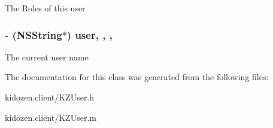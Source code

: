 The Roles of this user \hypertarget{interface_k_z_user_a0b3b6896d3941d8e3e646c2f974ecec0}{
\subsubsection[{user}]{\setlength{\rightskip}{0pt plus 5cm}-\/ (N\-S\-String$\ast$) user\hspace{0.3cm}{\ttfamily [read]}, {\ttfamily [write]}, {\ttfamily [nonatomic]}, {\ttfamily [strong]}}}\label{interface_k_z_user_a0b3b6896d3941d8e3e646c2f974ecec0}
The current user name 

The documentation for this class was generated from the following files\-:\begin{DoxyCompactItemize}
\item 
kidozen.\-client/K\-Z\-User.\-h\item 
kidozen.\-client/K\-Z\-User.\-m\end{DoxyCompactItemize}
